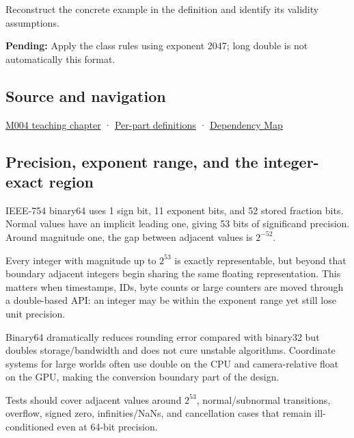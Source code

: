Reconstruct the concrete example in the definition and identify its validity assumptions.

\textbf{Pending:} Apply the class rules using exponent 2047; long double is not automatically this format.

\subsection{Source and navigation}\label{appendix-5078dfab64e6-source-and-navigation}

\hyperref[01-foundations-i-ch001-a-stretching-ruler-for-real-valued-quantities]{M004 teaching chapter} · \hyperref[appendix-fd090d982a15-m004---parts-61-76]{Per-part definitions} · \hyperref[appendix-4ad47bdd269a]{Dependency Map}

\subsection{Precision, exponent range, and the integer-exact region}\label{appendix-5078dfab64e6-precision-exponent-range-and-the-integer-exact-region}

IEEE-754 binary64 uses 1 sign bit, 11 exponent bits, and 52 stored fraction bits. Normal values have an implicit leading one, giving 53 bits of significand precision. Around magnitude one, the gap between adjacent values is \(2^{-52}\).

Every integer with magnitude up to \(2^{53}\) is exactly representable, but beyond that boundary adjacent integers begin sharing the same floating representation. This matters when timestamps, IDs, byte counts or large counters are moved through a double-based API: an integer may be within the exponent range yet still lose unit precision.

Binary64 dramatically reduces rounding error compared with binary32 but doubles storage/bandwidth and does not cure unstable algorithms. Coordinate systems for large worlds often use double on the CPU and camera-relative float on the GPU, making the conversion boundary part of the design.

Tests should cover adjacent values around \(2^{53}\), normal/subnormal transitions, overflow, signed zero, infinities/NaNs, and cancellation cases that remain ill-conditioned even at 64-bit precision.
